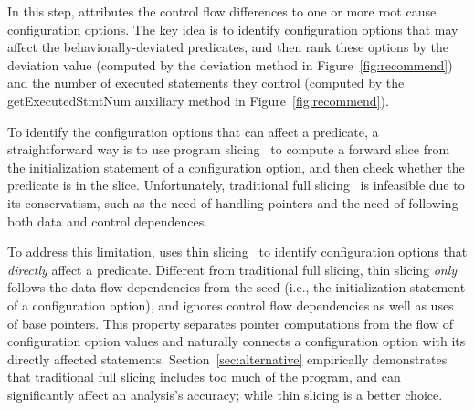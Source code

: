 



In this step, \ourtool attributes the control flow differences
to one or more root cause configuration options.
The key idea is to identify configuration options that
may affect the behaviorally-deviated predicates, and then rank
these options by 
the deviation value (computed by the
{deviation} method in Figure~\ref{fig:recommend})
and the number of executed statements they control (computed
by the {getExecutedStmtNum} auxiliary method in Figure~\ref{fig:recommend}).


To identify the configuration options that can affect
a predicate, a straightforward way is to use program slicing~\cite{Weiser:1981}
to compute a forward slice from the initialization statement
of a configuration option, and then check whether the predicate is
in the slice. Unfortunately, traditional
full slicing~\cite{Weiser:1981} is infeasible due
to its conservatism, such as the need of handling pointers
and the need of following both data and control dependences.


To address this limitation, \ourtool uses thin slicing~\cite{Sridharan:2007}
to identify configuration options that \textit{directly} affect
a predicate. Different from traditional full slicing,
thin slicing \textit{only} follows the data flow dependencies
from the seed (i.e., the initialization statement of a
configuration option), and ignores control flow dependencies
as well as uses of base pointers. This property separates
pointer computations from the flow of configuration option
values and naturally connects a configuration option with its
directly affected statements. Section~\ref{sec:alternative}
empirically demonstrates that traditional full slicing includes
too much of the program, and can significantly affect an analysis's
accuracy; while thin slicing is a better
choice.


